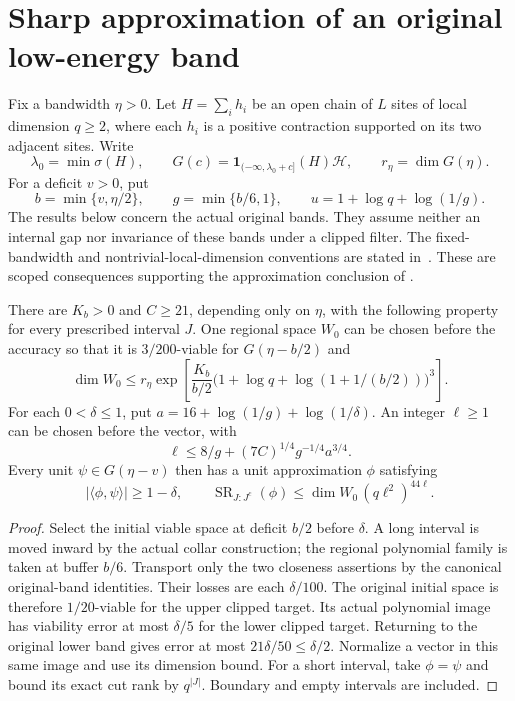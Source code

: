 \section{Sharp approximation of an original low-energy band}

Fix a bandwidth $\eta>0$. Let $H=\sum_i h_i$ be an open chain of $L$
sites of local dimension $q\ge2$, where each $h_i$ is a positive
contraction supported on its two adjacent sites. Write
\[
    \lambda_0=\min\sigma(H),\qquad
    G(c)=\mathbf1_{(-\infty,\lambda_0+c]}(H)\mathcal H,\qquad
    r_\eta=\dim G(\eta).
\]
For a deficit $v>0$, put
\[
    b=\min\{v,\eta/2\},\qquad g=\min\{b/6,1\},\qquad
    u=1+\log q+\log(1/g).
\]
The results below concern the actual original bands. They assume neither
an internal gap nor invariance of these bands under a clipped filter.
The fixed-bandwidth and nontrivial-local-dimension conventions are stated
in~\cite{gap:alvv16_low_energy_family_scope}. These are scoped consequences
supporting the approximation conclusion of
\cite[Theorem~thm:al-ld, lines 1096--1105]{Arad2016RigorousRG}.

\begin{lemma}
    \label{lem:ld_sharp_normalized_independent_scales}
    \leanok
    There are $K_b>0$ and $C\ge21$, depending only on $\eta$, with
    the following property for every prescribed interval $J$.
    One regional space $W_0$ can be chosen before the accuracy so that
    it is $3/200$-viable for $G(\eta-b/2)$ and
    \[
        \dim W_0\le r_\eta\exp\!\left[
            \frac{K_b}{b/2}
            \bigl(1+\log q+\log(1+1/(b/2))\bigr)^3\right].
    \]
    For each $0<\delta\le1$, put
    $a=16+\log(1/g)+\log(1/\delta)$.
    An integer $\ell\ge1$ can be chosen before the vector, with
    \[
        \ell\le8/g+(7C)^{1/4}g^{-1/4}a^{3/4}.
    \]
    Every unit $\psi\in G(\eta-v)$ then has a unit approximation
    $\phi$ satisfying
    \[
        |\langle\phi,\psi\rangle|\ge1-\delta,\qquad
        \operatorname{SR}_{J:J^c}(\phi)
        \le\dim W_0\,(q\ell^2)^{44\ell}.
    \]
\end{lemma}
\begin{proof}\leanok
    Select the initial viable space at deficit $b/2$ before $\delta$.
    A long interval is moved inward by the actual collar construction;
    the regional polynomial family is taken at buffer $b/6$.
    Transport only the two closeness assertions by the canonical
    original-band identities. Their losses are each $\delta/100$.
    The original initial space is therefore $1/20$-viable for the
    upper clipped target. Its actual polynomial image has viability
    error at most $\delta/5$ for the lower clipped target.
    Returning to the original lower band gives error at most
    $21\delta/50\le\delta/2$.
    Normalize a vector in this same image and use its dimension bound.
    For a short interval, take $\phi=\psi$ and bound its exact cut rank
    by $q^{|J|}$. Boundary and empty intervals are included.
\end{proof}

